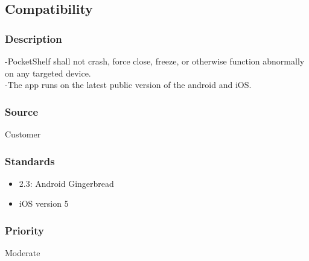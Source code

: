 

\subsection{Compatibility}
\subsubsection{Description}

-PocketShelf shall not crash, force close, freeze, or otherwise function abnormally on any targeted device.\\
-The app runs on the latest public version of the android and iOS.
\subsubsection{Source}
Customer
\subsubsection{Standards}
\begin{itemize}
\item2.3: Android Gingerbread
\item iOS version 5 
\end{itemize}
\subsubsection{Priority}
Moderate